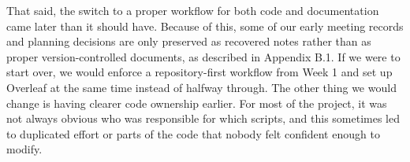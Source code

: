 That said, the switch to a proper workflow for both code and documentation came later than it should have. Because of this, some of our early meeting records and planning decisions are only preserved as recovered notes rather than as proper version-controlled documents, as described in Appendix B.1. If we were to start over, we would enforce a repository-first workflow from Week 1 and set up Overleaf at the same time instead of halfway through. The other thing we would change is having clearer code ownership earlier. For most of the project, it was not always obvious who was responsible for which scripts, and this sometimes led to duplicated effort or parts of the code that nobody felt confident enough to modify.
